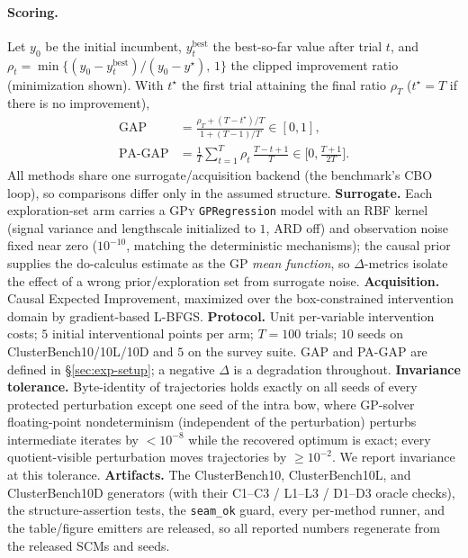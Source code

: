 \documentclass[twoside]{article}
\newcommand{\CBO}{\textsc{CBO}}
\begin{document}
\paragraph{Scoring.}
Let $y_0$ be the initial incumbent, $y^{\mathrm{best}}_t$ the best-so-far
value after trial $t$, and
$\rho_t=\min\{(y_0-y^{\mathrm{best}}_t)/(y_0-y^\star),\,1\}$ the clipped
improvement ratio (minimization shown). With $t^\star$ the first trial
attaining the final ratio $\rho_T$ ($t^\star{=}T$ if there is no improvement),
\begin{align*}
\mathrm{GAP}&=\frac{\rho_T+(T-t^\star)/T}{1+(T-1)/T}\in[0,1],\\
\text{PA-GAP}&=\frac{1}{T}\sum_{t=1}^{T}\rho_t\,\frac{T-t+1}{T}
\in\Big[0,\tfrac{T+1}{2T}\Big].
\end{align*}
All methods share one surrogate/acquisition backend (the benchmark's \CBO{} loop), so
comparisons differ only in the assumed structure. \textbf{Surrogate.} Each
exploration-set arm carries a \textsc{GPy} \texttt{GPRegression} model with an RBF
kernel (signal variance and lengthscale initialized to $1$, ARD off) and observation
noise fixed near zero ($10^{-10}$, matching the deterministic mechanisms); the causal
prior supplies the do-calculus estimate as the GP \emph{mean function}, so
$\Delta$-metrics isolate the effect of a wrong prior/exploration set from surrogate
noise. \textbf{Acquisition.} Causal Expected Improvement, maximized over the
box-constrained intervention domain by gradient-based L-BFGS. \textbf{Protocol.}
Unit per-variable intervention costs; $5$ initial interventional points per arm;
$T{=}100$ trials; $10$ seeds on ClusterBench10/10L/10D and $5$ on the survey suite. GAP and
PA-GAP are defined in \S\ref{sec:exp-setup}; a negative $\Delta$ is a
degradation throughout. \textbf{Invariance tolerance.} Byte-identity of
trajectories holds exactly on all seeds of every protected perturbation except
one seed of the intra bow, where GP-solver floating-point nondeterminism
(independent of the perturbation) perturbs intermediate iterates by
$<\!10^{-8}$ while the recovered optimum is exact; every quotient-visible
perturbation moves trajectories by $\ge\!10^{-2}$. We report invariance at this
tolerance. \textbf{Artifacts.} The ClusterBench10, ClusterBench10L, and ClusterBench10D
generators (with their C1--C3 / L1--L3 / D1--D3 oracle checks), the structure-assertion tests,
the \texttt{seam\_ok} guard, every per-method runner, and the table/figure emitters are
released, so all reported numbers regenerate from the released SCMs and seeds.
\end{document}
